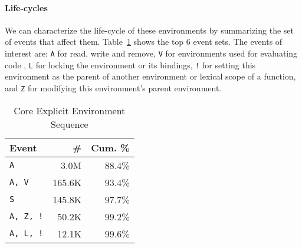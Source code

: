 \documentclass[10pt,review,sigplan,anonymous=true,authorversion=true,nonacm=true]{acmart}
\begin{document}
\paragraph{Life-cycles}
We can characterize the life-cycle of these environments by summarizing the set
of events that affect them. Table~\ref{table:core_explicit_env_seq} shows the
top 6 event sets. The events of interest are: \texttt{A} for read, write and
remove, \texttt{V} for environments used for evaluating code , \texttt{L} for
locking the environment or its bindings, \texttt{!} for setting this environment
as the parent of another environment or lexical scope of a function, and
\texttt{Z} for modifying this environment's parent environment.

\begin{table}[!h]
  \vspace{-3mm}
  \small
  \caption{Core Explicit Environment Sequence} \label{table:core_explicit_env_seq}
  \centering
  \begin{tabular}{lrr}
    \toprule
    \textbf{Event}&\textbf{\#}&\textbf{Cum. \%}\\
    \midrule
    \texttt{A}&3.0M&88.4\%\\
    \texttt{A, V}&165.6K&93.4\%\\
    \texttt{S}&145.8K&97.7\%\\
    \texttt{A, Z, !}&50.2K&99.2\%\\
    \texttt{A, L, !}&12.1K&99.6\%\\
    \bottomrule
  \end{tabular}
\end{table}
\end{document}
